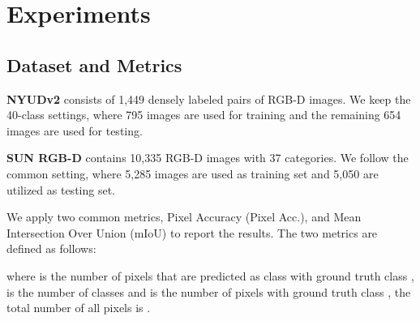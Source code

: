 \documentclass[lettersize,journal]{IEEEtran}
\begin{document}
\section{Experiments}
\label{Experiment}

\subsection{Dataset and Metrics}
\iffalse We evaluate the performance of our PDCNet on two popular RGB-D datasets: \fi

\textbf{NYUDv2} \cite{silberman2012indoor} consists of 1,449 densely labeled pairs of RGB-D images.
We keep the 40-class settings, where 795 images are used for training and the remaining 654 images are used for testing.

\textbf{SUN RGB-D} \cite{song2015sun} contains 10,335 RGB-D images with 37 categories. We follow the common setting, where 5,285 images are used as training set and 5,050 are utilized as testing set.

We apply two common metrics,  Pixel Accuracy (Pixel Acc.), and Mean Intersection Over Union (mIoU) to report the results.
The two metrics are defined as follows: 


where  is the number of pixels that are predicted as class  with ground truth class ,  is the number of classes and  is the number of pixels with ground truth class , the total number of all pixels is .
\end{document}
